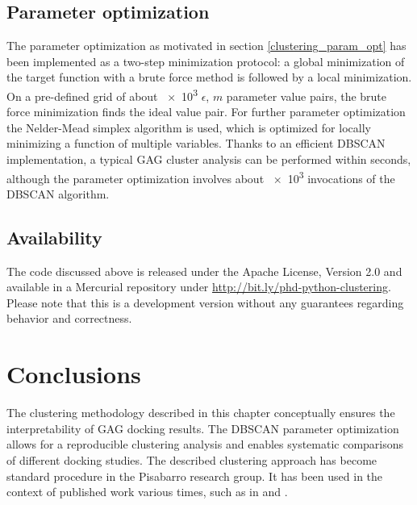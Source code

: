 \subsection{Parameter optimization}

The parameter optimization as motivated in section \ref{clustering_param_opt}
has been implemented as a two-step minimization protocol: a global minimization
of the target function with a brute force method is followed by a local
minimization. On a pre-defined grid of about \num{e3} $\epsilon$, $m$ parameter
value pairs, the brute force minimization finds the ideal value pair. For
further parameter optimization the Nelder-Mead simplex algorithm
\cite{nelder_mead} is used, which is optimized for locally minimizing a function
of multiple variables. Thanks to an efficient DBSCAN implementation, a typical
GAG cluster analysis can be performed within seconds, although the parameter
optimization involves about \num{e3} invocations of the DBSCAN algorithm.


\subsection{Availability}

The code discussed above is released under the Apache License, Version 2.0
\cite{apache_license_2} and available in a Mercurial repository under
\url{http://bit.ly/phd-python-clustering}. Please note that this is a
development version without any guarantees regarding behavior and correctness.


\section{Conclusions}

The clustering methodology described in this chapter conceptually ensures the
interpretability of GAG docking results. The DBSCAN parameter optimization
allows for a reproducible clustering analysis and enables systematic comparisons
of different docking studies. The described clustering approach has become
standard procedure in the Pisabarro research group. It has been used in the
context of published work various times, such as in \cite{franz_cathepsin_2013}
and \cite{dmd_samsonov_gehrcke_2014}.




